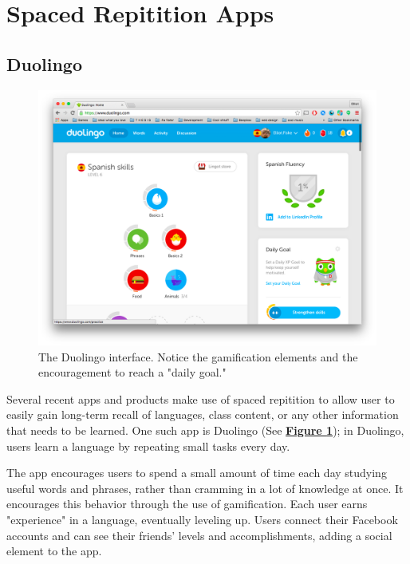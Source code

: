 
\section{Spaced Repitition Apps}
\subsection{Duolingo}

\begin{figure}
	\centerline{\includegraphics[width=1.2\linewidth]{duolingo}}
	\caption[Duolingo]{The Duolingo interface. Notice the gamification elements and the encouragement to reach a "daily goal."}
	\label{fig:duolingo}
\end{figure}

\par Several recent apps and products make use of spaced repitition to allow user to easily gain long-term recall of languages, class content, or any other information that needs to be learned. One such app is Duolingo (See \textbf{\hyperref[fig:duolingo]{Figure \ref*{fig:duolingo}}}); in Duolingo, users learn a language by repeating small tasks every day. 

\par The app encourages users to spend a small amount of time each day studying useful words and phrases, rather than cramming in a lot of knowledge at once. It encourages this behavior through the use of gamification. Each user earns "experience" in a language, eventually leveling up. Users connect their Facebook accounts and can see their friends' levels and accomplishments, adding a social element to the app.

